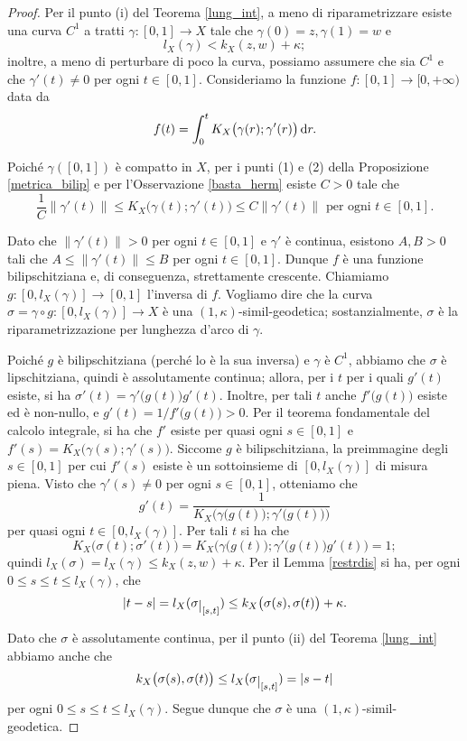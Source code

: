 \begin{proof}
    Per il punto (i) del Teorema \ref{lung_int}, a meno di riparametrizzare esiste una curva $C^1$ a tratti $\gamma:[0,1] \longrightarrow X$ tale che $\gamma(0)=z,\gamma(1)=w$ e
    $$l_X(\gamma)<k_X(z,w)+\kappa;$$
    inoltre, a meno di perturbare di poco la curva, possiamo assumere che sia $C^1$ e che $\gamma'(t)\not=0$ per ogni $t\in[0,1]$. Consideriamo la funzione $f:[0,1] \longrightarrow [0,+\infty)$ data da
    $$f(t)=\int_0^t K_X\big(\gamma(r);\gamma'(r)\big)\mathop{}\!\mathrm{d} r.$$

    Poiché $\gamma([0,1])$ è compatto in $X$, per i punti (1) e (2) della Proposizione \ref{metrica_bilip} e per l'Osservazione \ref{basta_herm} esiste $C>0$ tale che
    $$\frac{1}{C}\|\gamma'(t)\| \le K_X\big(\gamma(t);\gamma'(t)\big) \le C\|\gamma'(t)\|\text{ per ogni }t\in[0,1].$$

    Dato che $\|\gamma'(t)\|>0$ per ogni $t\in[0,1]$ e $\gamma'$ è continua, esistono $A,B>0$ tali che $A \le \|\gamma'(t)\|\le B$ per ogni $t\in[0,1]$. Dunque $f$ è una funzione bilipschitziana e, di conseguenza, strettamente crescente. Chiamiamo $g:[0,l_X(\gamma)] \longrightarrow [0,1]$ l'inversa di $f$. Vogliamo dire che la curva $\sigma=\gamma\circ g:[0,l_X(\gamma)] \longrightarrow X$ è una $(1,\kappa)$-simil-geodetica; sostanzialmente, $\sigma$ è la riparametrizzazione per lunghezza d'arco di $\gamma$.

    Poiché $g$ è bilipschitziana (perché lo è la sua inversa) e $\gamma$ è $C^1$, abbiamo che $\sigma$ è lipschitziana, quindi è assolutamente continua; allora, per i $t$ per i quali $g'(t)$ esiste, si ha $\sigma'(t)=\gamma'\big(g(t)\big)g'(t)$. Inoltre, per tali $t$ anche $f'\big(g(t)\big)$ esiste ed è non-nullo, e $g'(t)=1/f'\big(g(t)\big)>0$. Per il teorema fondamentale del calcolo integrale, si ha che $f'$ esiste per quasi ogni $s\in[0,1]$ e $f'(s)=K_X\big(\gamma(s);\gamma'(s)\big)$. Siccome $g$ è bilipschitziana, la preimmagine degli $s\in[0,1]$ per cui $f'(s)$ esiste è un sottoinsieme di $[0,l_X(\gamma)]$ di misura piena. Visto che $\gamma'(s)\not=0$ per ogni $s\in[0,1]$, otteniamo che
    $$g'(t)=\frac{1}{K_X\Big(\gamma\big(g(t)\big);\gamma'\big(g(t)\big)\Big)}$$
    per quasi ogni $t\in[0,l_X(\gamma)]$. Per tali $t$ si ha che
    $$K_X\big(\sigma(t);\sigma'(t)\big)=K_X\Big(\gamma\big(g(t)\big);\gamma'\big(g(t)\big)g'(t)\Big)=1;$$
    quindi $l_X(\sigma)=l_X(\gamma) \le k_X(z,w)+\kappa$. Per il Lemma \ref{restrdis} si ha, per ogni $0 \le s \le t \le l_X(\gamma)$, che
    $$|t-s|=l_X(\sigma\restrict{[s,t]}) \le k_X\big(\sigma(s),\sigma(t)\big)+\kappa.$$

    Dato che $\sigma$ è assolutamente continua, per il punto (ii) del Teorema \ref{lung_int} abbiamo anche che
    $$k_X\big(\sigma(s),\sigma(t)\big) \le l_X(\sigma\restrict{[s,t]})=|s-t|$$
    per ogni $0 \le s \le t \le l_X(\gamma)$. Segue dunque che $\sigma$ è una $(1,\kappa)$-simil-geodetica.
\end{proof}

